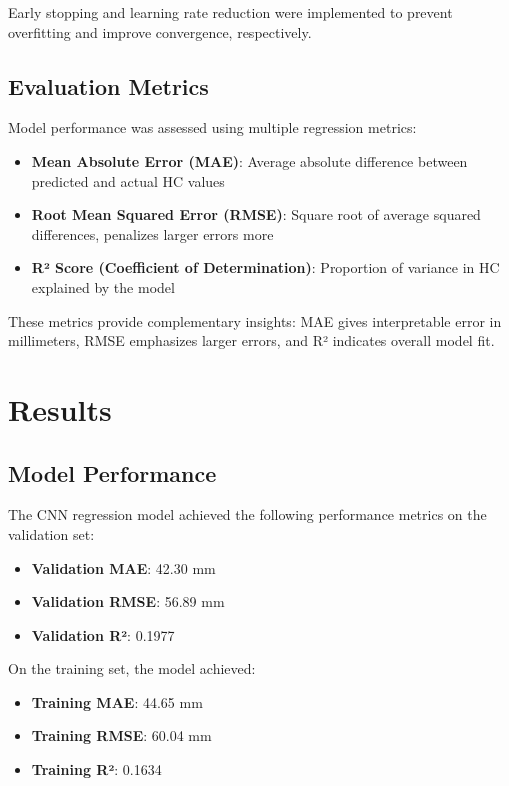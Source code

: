 \documentclass[conference]{IEEEtran}
\begin{document}
Early stopping and learning rate reduction were implemented to prevent overfitting and improve convergence, respectively.

\subsection{Evaluation Metrics}

Model performance was assessed using multiple regression metrics:
\begin{itemize}
    \item \textbf{Mean Absolute Error (MAE)}: Average absolute difference between predicted and actual HC values
    \item \textbf{Root Mean Squared Error (RMSE)}: Square root of average squared differences, penalizes larger errors more
    \item \textbf{R² Score (Coefficient of Determination)}: Proportion of variance in HC explained by the model
\end{itemize}

These metrics provide complementary insights: MAE gives interpretable error in millimeters, RMSE emphasizes larger errors, and R² indicates overall model fit.

\section{Results}

\subsection{Model Performance}

The CNN regression model achieved the following performance metrics on the validation set:
\begin{itemize}
    \item \textbf{Validation MAE}: 42.30 mm
    \item \textbf{Validation RMSE}: 56.89 mm
    \item \textbf{Validation R²}: 0.1977
\end{itemize}

On the training set, the model achieved:
\begin{itemize}
    \item \textbf{Training MAE}: 44.65 mm
    \item \textbf{Training RMSE}: 60.04 mm
    \item \textbf{Training R²}: 0.1634
\end{itemize}
\end{document}
